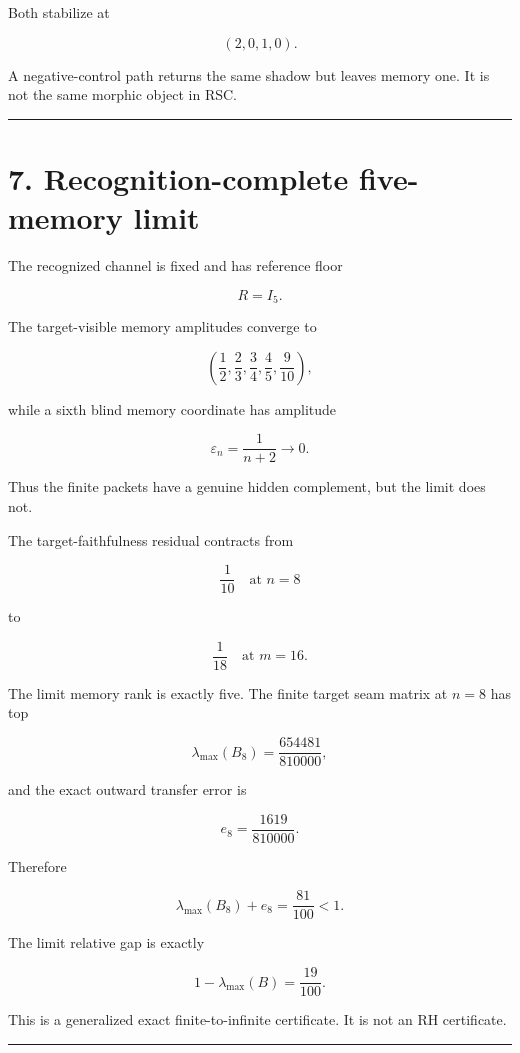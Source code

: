 Both stabilize at

\[
(2,0,1,0).
\]

A negative-control path returns the same shadow but leaves memory one. It is not the same morphic object in RSC.

\begin{center}\rule{0.5\linewidth}{0.5pt}\end{center}

\hypertarget{recognition-complete-five-memory-limit}{%
\section{7. Recognition-complete five-memory limit}\label{recognition-complete-five-memory-limit}}

The recognized channel is fixed and has reference floor

\[
R=I_5.
\]

The target-visible memory amplitudes converge to

\[
\left(\frac12,\frac23,\frac34,\frac45,\frac9{10}\right),
\]

while a sixth blind memory coordinate has amplitude

\[
\varepsilon_n=\frac1{n+2}\longrightarrow0.
\]

Thus the finite packets have a genuine hidden complement, but the limit does not.

The target-faithfulness residual contracts from

\[
\frac1{10}
\quad\text{at }n=8
\]

to

\[
\frac1{18}
\quad\text{at }m=16.
\]

The limit memory rank is exactly five. The finite target seam matrix at \(n=8\) has top

\[
\lambda_{\max}(B_8)=\frac{654481}{810000},
\]

and the exact outward transfer error is

\[
e_8=\frac{1619}{810000}.
\]

Therefore

\[
\boxed{
\lambda_{\max}(B_8)+e_8
=
\frac{81}{100}<1.
}
\]

The limit relative gap is exactly

\[
\boxed{
1-\lambda_{\max}(B)=\frac{19}{100}.
}
\]

This is a generalized exact finite-to-infinite certificate. It is not an RH certificate.

\begin{center}\rule{0.5\linewidth}{0.5pt}\end{center}

